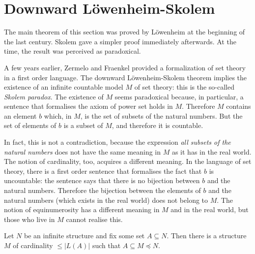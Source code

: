 \section{Downward Löwenheim-Skolem}
\label{LoewenheimSkolem}


The main theorem of this section was proved by L\"owenheim at the beginning of the last century.
Skolem gave a simpler proof immediately afterwards.
At the time, the result was perceived as paradoxical.

A few years earlier, Zermelo and Fraenkel provided a formalization of set theory in a first order language.
The downward L\"owenheim-Skolem theorem implies the existence of an infinite countable model $M$ of set theory: this is the so-called  \emph{Skolem paradox}.
The existence of  $M$ seems paradoxical because, in particular, a sentence that formalises the axiom of power set holds in $M$.
Therefore $M$ contains an element $b$ which, in $M$, is the set of subsets of the natural numbers.
But the set of elements of $b$ is a subset of $M$, and therefore it is countable.

In fact, this is not a contradiction, because the expression \textit{all subsets of the natural numbers\/} does not have the same meaning in $M$ as it has in the real world.
The notion of cardinality, too, acquires a different meaning.
In the language of set theory, there is a first order sentence that formalises the fact that $b$ is uncountable: the sentence says that there is no bijection between $b$ and the natural numbers.
Therefore the bijection between the elements of $b$ and the natural numbers (which exists in the real world) does not belong to $M$.
The notion of equinumerosity has a different meaning in $M$ and in the real world, but those who live in $M$ cannot realise this.

\begin{theorem}\label{thm_lowenheimskolemallingiu}
Let $N$ be an infinite structure and fix some set $A\subseteq N$.
Then there is a structure $M$ of cardinality $\le|L(A)|$ such that $A\subseteq M\preceq N$.
\end{theorem}

